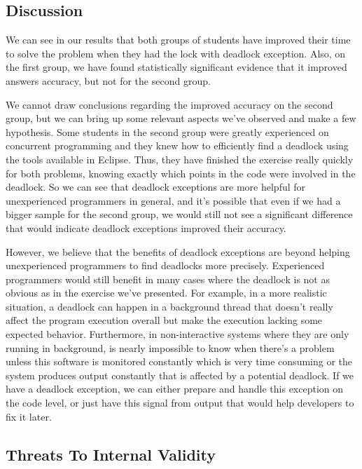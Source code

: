
\subsection{Discussion}


We can see in our results that both groups of students have improved their time to solve the problem when they had the lock with deadlock exception. Also, on the first group, we have found statistically significant evidence that it improved answers accuracy, but not for the second group.

We cannot draw conclusions regarding the improved accuracy on the second group, but we can bring up some relevant aspects we've observed and make a few hypothesis. Some students in the second group were greatly experienced on concurrent programming and they knew how to efficiently find a deadlock using the tools available in Eclipse. Thus, they have finished the exercise really quickly for both problems, knowing exactly which points in the code were involved in the deadlock. So we can see that deadlock exceptions are more helpful for unexperienced programmers in general, and it's possible that even if we had a bigger sample for the second group, we would still not see a significant difference that would indicate deadlock exceptions improved their accuracy.

However, we believe that the benefits of deadlock exceptions are beyond helping unexperienced programmers to find deadlocks more precisely. Experienced programmers would still benefit in many cases where the deadlock is not as obvious as in the exercise we've presented. For example, in a more realistic situation, a deadlock can happen in a background thread that doesn't really affect the program execution overall but make the execution lacking some expected behavior. Furthermore, in non-interactive systems where they are only running in background, is nearly impossible to know when there's a problem unless this software is monitored constantly which is very time consuming or the system produces output constantly that is affected by a potential deadlock. If we have a deadlock exception, we can either prepare and handle this exception on the code level, or just have this signal from output that would help developers to fix it later.

\subsection{Threats To Internal Validity}

